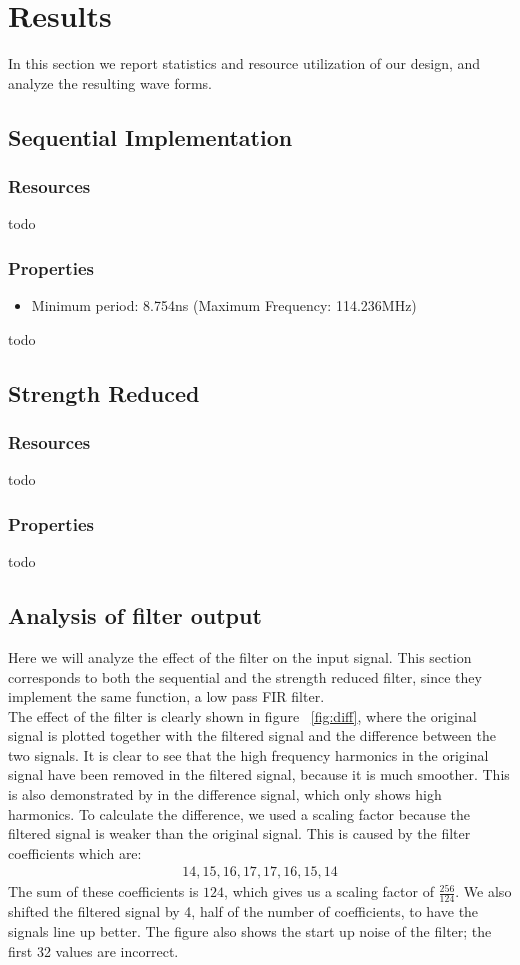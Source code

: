 \section{Results}
In this section we report statistics and resource utilization of our design, and analyze the resulting wave forms.
\subsection{Sequential Implementation}
\subsubsection{Resources}
todo
\subsubsection{Properties}
\begin{itemize}
\item Minimum period: 8.754ns (Maximum Frequency: 114.236MHz)
\end{itemize}
todo
\subsection{Strength Reduced}
\subsubsection{Resources}
todo
\subsubsection{Properties}
todo
\subsection{Analysis of filter output}
Here we will analyze the effect of the filter on the input signal. This section corresponds to both the sequential and the strength reduced filter, since they implement the same function, a low pass FIR filter.\\
The effect of the filter is clearly shown in figure  ~\ref{fig:diff}, where the original signal is plotted together with the filtered signal and the difference between the two signals. It is clear to see that the high frequency harmonics in the original signal have been removed in the filtered signal, because it is much smoother. This is also demonstrated by in the difference signal, which only shows high harmonics. To calculate the difference, we used a scaling factor because the filtered signal is weaker than the original signal. This is caused by the filter coefficients which are:
\begin{gather*}
14,15,16,17,17,16,15,14
\end{gather*}
The sum of these coefficients is $124$, which gives us a scaling factor of $\frac{256}{124}$. We also shifted the filtered signal by 4, half of the number of coefficients, to have the signals line up better. The figure also shows the start up noise of the filter; the first 32 values are incorrect.

